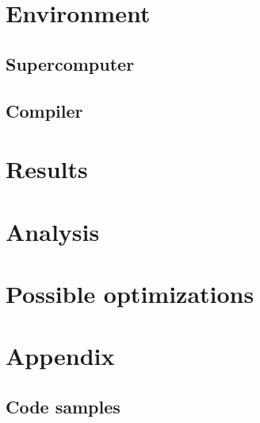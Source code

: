 \documentclass{article}
\begin{document}
\section{Environment}
\subsection{Supercomputer}

\subsection{Compiler}

\section{Results}

\section{Analysis}

\section{Possible optimizations}

\section{Appendix}
\subsection{Code samples}
\end{document}
